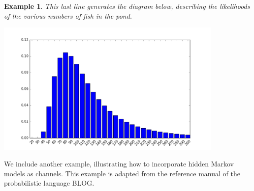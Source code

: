 \documentclass[leqno]{tufte-book} %
\newtheorem{example}[theorem]{Example}
\begin{document}
\begin{example}
\noindent This last line generates the diagram below, describing the
likelihoods of the various numbers of fish in the pond.
\begin{center}
\includegraphics[width=30em]{Pictures/capture-recapture.png} 
\end{center}
\end{example}


We include another example, illustrating how to incorporate hidden
Markov models as channels.  This example is
adapted from the reference manual of the probabilistic language
BLOG\cite{MilchMRSOK07}.
\end{document}
